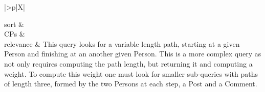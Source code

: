 \begin{tabularx}{\queryCardWidth}{|>{\queryPropertyCell}p{\queryPropertyCellWidth}|X|}
%
	
		sort		&
		\innerCardVSpace \\ \hline
	CPs &
	 \\ \hline
	relevance &
		\small This query looks for a variable length path, starting at a given Person and finishing at an another given Person. This
is a more complex query as not only requires computing the path length, but returning it and computing a weight.
To compute this weight one must look for smaller sub-queries with paths of length three, formed by the two Persons
at each step, a Post and a Comment.
 \\ \hline%
\end{tabularx}
\queryCardVSpace